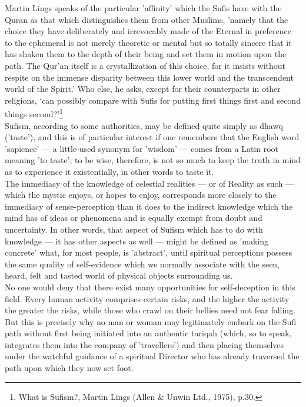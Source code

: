 \documentclass[10pt, twoside]{book}
\begin{document}
Martin Lings speaks of the particular 'affinity' which the Sufis have with the Quran as that which 
distinguishes them from other Muslims, 'namely that the choice they have deliberately and irrevocably 
made of the Eternal in preference to the ephemeral is not merely theoretic or mental but so totally 
sincere that it has shaken them to the depth of their being and set them in motion upon the path. The 
Qur'an itself is a crystallization of this choice, for it insists without respite on the immense 
disparity between this lower world and the transcendent world of the Spirit.' Who else, he asks, 
except for their counterparts in other religions, `can possibly compare with Sufis for putting first 
things first and second things second?'\footnote{What is Sufism?, Martin Lings (Allen \& Unwin Ltd., 1975), p.30.} \\

Sufism, according to some authorities, may be defined quite simply as dhawq ('taste'), and this is of 
particular interest if one remembers that the English word 'sapience' --- a little-used synonym for 
'wisdom' --- comes from a Latin root meaning 'to taste'; to be wise, therefore, is not so much to keep 
the truth in mind as to experience it existentially, in other words to taste it. \\

The immediacy of the knowledge of celestial realities --- or of Reality as such --- which the mystic 
enjoys, or hopes to enjoy, corresponds more closely to the immediacy of sense\hyp{}perception than it does 
to the indirect knowledge which the mind has of ideas or phenomena and is equally exempt from doubt 
and uncertainty. In other words, that aspect of Sufism which has to do with knowledge --- it has other 
aspects as well --- might be defined as 'making concrete' what, for most people, is 'abstract', until 
spiritual perceptions possess the same quality of self\hyp{}evidence which we normally associate with the 
seen, heard, felt and tasted world of physical objects surrounding us. \\

No one would deny that there exist many opportunities for self\hyp{}deception in this field. Every human 
activity comprises certain risks, and the higher the activity the greater the risks, while those who 
crawl on their bellies need not fear falling. But this is precisely why no man or woman may 
legitimately embark on the Sufi path without first being initiated into an authentic tariqah (which, 
so to speak, integrates them into the company of 'travellers') and then placing themselves under the 
watchful guidance of a spiritual Director who has already traversed the path upon which they now set 
foot. \\
\end{document}
